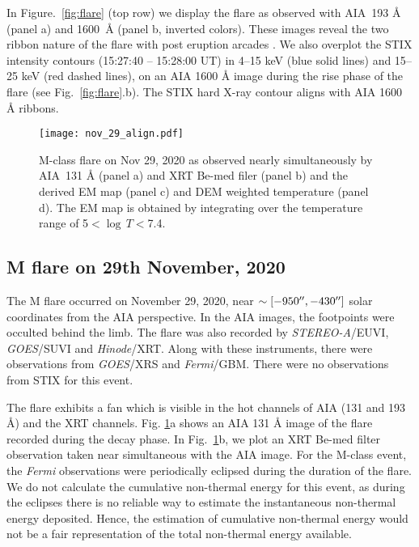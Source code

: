 In Figure.~\ref{fig:flare} (top row) we display the flare as observed with AIA~193 {\AA} (panel a) and 1600~{\AA} (panel b, inverted colors). These images reveal the two ribbon nature of the flare with post eruption arcades \cite[see e.g.][]{TriBC_2004}. We also overplot the STIX intensity contours (15:27:40 {--} 15:28:00 UT) in 4{--}15 keV (blue solid lines) and 15{--}25 keV (red dashed lines), on an AIA 1600 {\AA} image during the rise phase of the flare (see Fig.~\ref{fig:flare}.b). The STIX hard X-ray contour aligns with AIA 1600 {\AA} ribbons.


\begin{figure}[ht!]
\centering
    \texttt{[image: nov\_29\_align.pdf]}
    \caption{M-class flare on Nov 29, 2020 as observed nearly simultaneously by AIA~{131 \AA} (panel a) and XRT Be-med filer (panel b) and the derived EM map (panel c) and DEM weighted temperature (panel d). The EM map is obtained by integrating over the temperature range of 5$<\log\,T<$7.4.}
    \label{fig:flare2}
\end{figure}

\subsection{M flare on 29th November, 2020}\label{sec:m-obs}

The M flare occurred on November 29, 2020, near $\sim [-950\hbox{$^{\prime\prime}$},-430\hbox{$^{\prime\prime}$}]$ solar coordinates from the AIA perspective. In the AIA images, the footpoints were occulted behind the limb. The flare was also recorded by {\it STEREO-A}/EUVI, {\it GOES}/SUVI and {\it Hinode}/XRT. Along with these instruments, there were observations from {\it GOES}/XRS and {\it Fermi}/GBM. There were no observations from STIX for this event.

The flare exhibits a fan which is visible in the hot channels of AIA (131 and 193 {\AA}) and the XRT channels. Fig. \ref{fig:flare2}a shows an AIA 131 {\AA} image of the flare recorded during the decay phase. In Fig.~\ref{fig:flare2}b, we plot an XRT Be-med filter observation taken near simultaneous with the AIA image. For the M-class event, the {\it Fermi} observations were periodically eclipsed during the duration of the flare. We do not calculate the cumulative non-thermal energy for this event, as during the eclipses there is no reliable way to estimate the instantaneous non-thermal energy deposited. Hence, the estimation of cumulative non-thermal energy would not be a fair representation of the total non-thermal energy available.

